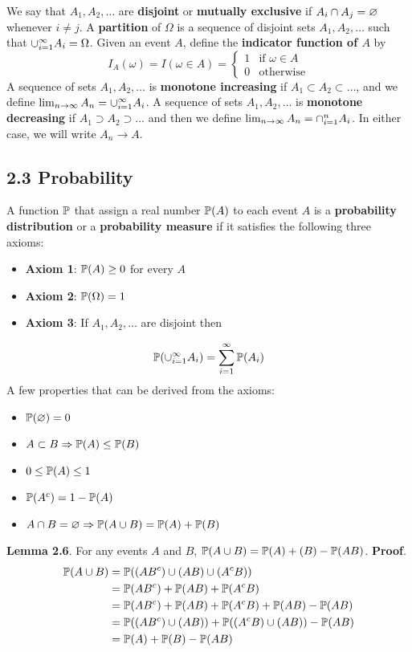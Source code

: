 We say that \(A_{1}, A_{2}, \dots\) are \textbf{disjoint} or \textbf{mutually exclusive} if \(A_{i} \cap A_{j} = \varnothing\) whenever \(i \neq j\). A \textbf{partition} of \(\Omega\) is a sequence of disjoint sets \(A_{1}, A_{2}, \dots\) such that \(\cup_{i=1}^{\infty} A_{i} = \Omega\). Given an event \(A\), define the \textbf{indicator function of \(A\)} by
\[
I_A(\omega) = I(\omega \in A) = 
\begin{cases}
1 &\text{if } \omega \in A 
\\
0 &\text{otherwise}
\end{cases}
\]
A sequence of sets \(A_{1}, A_{2}, \dots\) is \textbf{monotone increasing}
if \(A_{1} \subset A_{2} \subset \dots\), and we define \(\lim_{n \rightarrow \infty} A_{n} = \cup_{i=1}^{\infty} A_{i}\). A sequence of sets \(A_{1}, A_{2}, \dots\) is \textbf{monotone decreasing} if \(A_{1} \supset A_{2} \supset \dots\) and then we define \(\lim_{n \rightarrow \infty} A_{n} = \cap_{i=1}^{n} A_{i}\). In either case, we will write \(A_{n} \rightarrow A\).

\subsection*{2.3 Probability}
A function \(\operatorname{\mathbb{P}}\) that assign a real number \(\operatorname{\mathbb{P}}(A)\) to each event \(A\) is a \textbf{probability distribution} or a \textbf{probability measure} if it satisfies the following three axioms:
\begin{itemize}[tightlist]
\item
  \textbf{Axiom 1}: \(\operatorname{\mathbb{P}}(A) \geq 0\) for every \(A\)
\item
  \textbf{Axiom 2}: \(\operatorname{\mathbb{P}}(\Omega) = 1\)
\item
  \textbf{Axiom 3}: If \(A_{1}, A_{2}, \dots\) are disjoint then
\end{itemize}
\[
\PROB \left( \union_{i=1}^{\infty} A_{i} \right) = \sum_{i=1}^{\infty} \PROB(A_{i})
\]
A few properties that can be derived from the axioms:
\begin{itemize}[tightlist]
\item
  \(\operatorname{\mathbb{P}}(\varnothing) = 0\)
\item
  \(A \subset B \Rightarrow \operatorname{\mathbb{P}}(A) \leq \operatorname{\mathbb{P}}(B)\)
\item
  \(0 \leq \operatorname{\mathbb{P}}(A) \leq 1\)
\item
  \(\PROB\left(A^{c}\right) = 1 - \PROB(A)\)
\item
  \(A \cap B = \varnothing \Rightarrow \operatorname{\mathbb{P}}(A \cup B) = \operatorname{\mathbb{P}}(A) + \operatorname{\mathbb{P}}(B)\)
\end{itemize}
\textbf{Lemma 2.6}. For any events \(A\) and \(B\),
\(\operatorname{\mathbb{P}}(A \cup B) = \operatorname{\mathbb{P}}(A) + \mathbb(B) - \operatorname{\mathbb{P}}(AB)\).
\textbf{Proof}.
\begin{align*}
\PROB(A \union B) 
&= \PROB\left( (AB^{c}) \union (AB) \union (A^{c}B) \right) 
\\
&= \PROB(AB^{c}) + \PROB(AB) + \PROB(A^{c}B) 
\\
&= \PROB(AB^{c}) + \PROB(AB) + \PROB(A^{c}B) + \PROB(AB) - \PROB(AB) 
\\
&= \PROB((AB^{c}) \union (AB)) + \PROB((A^{c}B) \union (AB)) - \PROB(AB) 
\\
&= \PROB(A) + \PROB(B) - \PROB(AB)
\end{align*}


